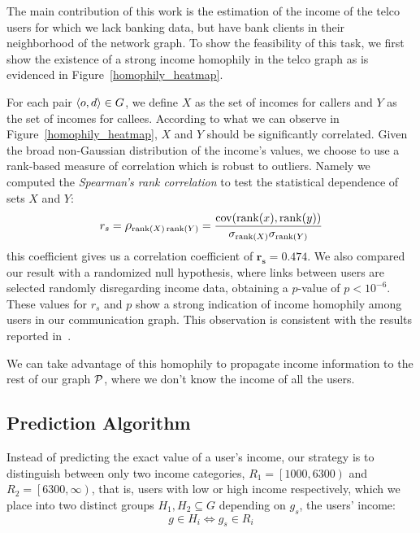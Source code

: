 The main contribution of this work is the estimation of the income of the telco users for which we lack banking data, but have bank clients in their neighborhood of the network graph. To show the feasibility of this task, we first show the existence of a strong income homophily in the telco graph as is evidenced in Figure~\ref{homophily_heatmap}.


For each pair \( \left< o, d \right> \in \mathlarger{G} \), we define \( X \) as the set of incomes for callers and \( Y \) as the set of incomes for callees. According to what we can observe in Figure~\ref{homophily_heatmap}, \( X \) and \( Y \) should be significantly correlated. Given the broad non-Gaussian distribution of the income's values, we choose to use a rank-based measure of correlation which is robust to outliers.
Namely we computed the \textit{Spearman's rank correlation} %
to test the statistical dependence of sets \( X \) and \( Y \):
\begin{equation}
r_s = \mathlarger{\rho}_{\operatorname{rank}(X) \operatorname{rank}(Y)} = \frac{\operatorname{cov}(\operatorname{rank}(x), \operatorname{rank}(y))}{\sigma_{\operatorname{rank}(X)} \sigma_{\operatorname{rank}(Y)}}
\label{spearman}
\end{equation}
this coefficient gives us a correlation coefficient of $\mathbf{r_s = 0.474}$. We also compared our result with a randomized null hypothesis, where links between users are selected randomly disregarding income data, obtaining a $p$-value of $ p < 10^{-6} $. These values for $r_s$ and $p$ show a strong indication of income homophily among users in our communication graph.
This observation is consistent with the results reported in~\cite{leo2015socioeconomic}.

We can take advantage of this homophily to propagate income information to the rest of our graph $ \mathcal{P} $, where we don't know the income of all the users.


\subsection{Prediction Algorithm}

Instead of predicting the exact value of a user's income, our strategy is to distinguish between only two income categories, $R_1 = \left[1000, 6300\right)$ and $R_2 = \left[6300, \infty\right)$, that is, users with low or high income respectively, which we place into two distinct groups $ H_1, H_2 \subseteq G$ depending on \( g_s \), the users' income:
\[
	g \in H_i \iff g_s \in R_i
\]

